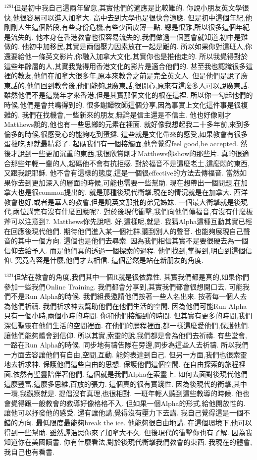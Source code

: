 \documentclass{book}
\begin{document}
$^{1281}$但是初中我自己這兩年留意,其實他們的適應是比較難的.
你說小朋友英文學很快,他很容易可以進入加拿大.
高中去到大學也是很快會適應.
但是初中這個年紀,他剛剛人生這個階段,有些身份危機,有些少面皮薄一點.
總是很難,所以很多這個年紀是流失的.
他本身在香港教會也很容易流失的,我們做過一個墓會就知道,初中是難做的.
他初中加移民,其實是兩個壓力因素放在一起是難的.
所以如果你對這班人,你還要給他一條英文影片,你融入加拿大文化,其實你也是推他走的.
所以我覺得對於這些年齡層的人,其實我覺得用香港文化的影片是適合他們的.
甚至我也認識很多這裡的教友,他們在加拿大很多年,原本來教會之前是完全英文人.
但是他們是說了廣東話的,他們回到教會後,他們能夠說廣東話,很開心,原來有這麼多人可以說廣東話.
雖然他們不是這幾年才來香港,但是其實那個文化的根在這裡.
所以你一勾起他們的時候,他們是會共鳴得到的.
很多謝譚牧師這個分享,因為事實上文化這件事是很複雜的.
我們在找機會,一些新來的朋友,無論是信主還是不信主.
他也好像剛才Matthews說的,他也有一些思鄉的元素在裡面.
就好像我想起我二十多年前,來到多倫多的時候,很感受心的能夠吃到蛋撻.
這些就是文化帶來的感受,如果教會有很多蛋撻吃,那就最精彩了.
起碼我們有一個接觸面,他會覺得feel good,be accepted.
然後才說到一些更加沉重的東西,我很欣賞剛才Matthews你show的那些片.
真的很適合那些年輕一輩的人,起碼他不會有抗拒感.
對於福音不是這麼老土,這麼悶的東西,又跟我說耶穌.
他不會有這樣的態度,這是一個很effective的方法去傳福音.
當然如果你去到更加深入的層面的時候,可能也需要一些幫助.
現在想帶出一個問題,在加拿大也是很common提出的.
就是那種後現代衝擊,現在的情況就是在加拿大.
西洋教會也好,或者是華人的教會,但是說英文那批的弟兄姊妹.
一個最大衝擊就是後現代,兩位講完有沒有什麼回應呢?.
對於後現代衝擊,我們向他們傳福音,有沒有什麼板斧可以注意到?.
Matthews你先說吧.
好,這樣呢,就是.
我猜Alpha這種互動其實已經在回應後現代他們.
期待他們進入某一個社群,聽到別人的聲音.
也能夠展現自己聲音的其中一個方向.
這個也是他們去尋索.
因為我們相信其實不是要很硬去為一個信仰去給予人.
而是他們真的透過一個探索的過程.
他們找到,掌握到,明白到這個信仰.
究竟內容是什麼,他們才去相信.
這個當然是站在新朋友的角度.

$^{1321}$但站在教會的角度,我們其中一個R就是很依靠性.
其實我們都是真的,如果你們參加一些我們Online Training.
我們都會分享到,其實我們都會很想開口去.
可能我們不是Run Alpha的時候.
我們組長邀請他們按著一些人名出來.
按著每一個人去為他們祈禱.
我們祈求神去幫助他們在他們生活的空間.
因為他們可能Run Alpha只有一個小時,兩個小時的時間.
你和他們接觸到的時間.
但其實有更多的時間,我們深信聖靈在他們生活的空間裡面.
在他們的歷程裡面,都一樣這麼愛他們,保護他們.
讓他們能夠體會到信仰.
所以其實,索靈的說,我們都是會為他們去祈禱.
有些堂會,一路在Run Alpha的時候.
同步地有禱告隊在旁邊,同步為這些人去祈禱.
所以我們一方面去容讓他們有自由,空間,互動.
能夠表達到自己.
但另一方面,我們也很索靈地去祈求神.
保護他們這些自由的思想.
保護他們這個空間.
在自由探索的旅程裡面,依然有聖靈陪伴著他們.
這個就是我們Alpha在索靈上.
如何去面對後現代他們這麼豐富,這麼多思維,百放的張力.
這個真的很有實踐性.
因為後現代的衝擊,其中一環,我觀察就是.
提倡沒有真理,也很相對.
一班年輕人聽到這些教導的時候.
他也會覺得跟一般教會的教導好像格格不入.
但如果一個Alpha的形式,給他開放性的.
讓他可以抒發他的感受.
還有讓他講,覺得沒有壓力下去講.
我自己覺得這是一個不錯的方向.
最低限度最能夠break the ice.
他能夠很自由地講.
在這個環境下,他可以得到一些幫助.
雖然譚浩思你來了加拿大不久.
但後現代的衝擊你也有了解.
因為我知道你在美國讀書.
你有什麼看法,對於後現代衝擊我們教會的東西.
我現在的體會,我自己也有看書.
\end{document}
